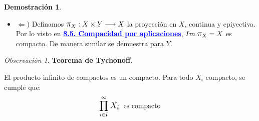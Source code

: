 \documentclass[12pt,twoside]{report}
\newcommand\mc[1]{\mathcal{#1}}
\theoremstyle{azul}
\theoremstyle{azul2}
\theoremstyle{plain}
\theoremstyle{definition}
\newtheorem*{dem}{Demostración}
\theoremstyle{remark}
\newtheorem*{obs}{Observación}
\begin{document}
\begin{dem}
\begin{itemize}
    La unión $\displaystyle N = \bigcup A_i$ es un abierto que contiene a $x_0 \times Y$, y por \textit{Paso 1}, el abierto $N$ contiene un tubo $W \times Y$ sobre $x_0 \times Y$ donde $W$ es abierto de $X$. Entonces $W \times Y$ está recubierto por un n{\'u}mero finito de $\{A_i\}$. 
    
    De esta forma, para cada $x \in X$, podemos elegir un $W$ tal que el tubo $W \times Y$ puede ser recubierto por elementos de $\mc{A}$ (de forma finita). La colección de todos los $W$ es recubrimiento de $X$. Por la compacidad de $X$, existe una colección finita de $W_i$ cubriendo a $X$. Por lo que la unión de los tubos 
    $$W_1 \times Y, \ldots, W_k \times Y$$
    es el espacio $X \times Y$, ya que cada uno puede ser cubierto por un n{\'u}mero finito de elementos de $\mc{A}$, de forma que $X \times Y$ es compacto. \hfill $\blacksquare$. 
    \item $\Leftarrow$) Definamos $\mathlarger{\mathlarger{\pi}}_X : X \times Y \longrightarrow X$ la proyección en $X$, continua y epiyectiva. Por lo visto en \hyperref[compapl]{\textcolor{blue}{\textbf{8.5. Compacidad por aplicaciones}}}, $Im \;  \mathlarger{\mathlarger{\pi}}_X = X$ es compacto. De manera similar se demuestra para $Y$.
\end{itemize}
\end{dem}
\begin{obs}
\textbf{Teorema de Tychonoff}. 
\begin{tcolorbox}
El producto infinito de compactos es un compacto. Para todo $X_i$ compacto, se cumple que: $$\mathlarger{\prod}_{i \in I}^{\infty} \; \mathlarger{X_i} \; \text{ es compacto}$$
\end{tcolorbox}
\end{obs}
\end{document}

